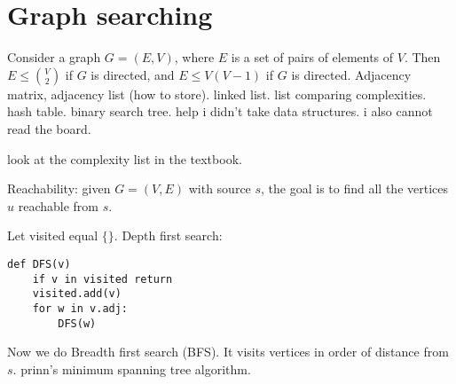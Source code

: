 \section{Graph searching} 
Consider a graph $G=(E,V)$, where $E$ is a set of pairs of elements of $V$. Then $E \leq {V \choose 2} $ if $G$ is directed, and $E \leq  V(V-1)$ if $G$ is directed. Adjacency matrix, adjacency list (how to store). linked list. list comparing complexities. hash table. binary search tree. help i didn't take data structures. i also cannot read the board.

look at the complexity list in the textbook.

Reachability: given $G=(V,E)$ with source $s$, the goal is to find all the vertices $u$ reachable from $s$.

Let visited equal $\{\} $. Depth first search:
\begin{verbatim}
def DFS(v)
    if v in visited return
    visited.add(v)
    for w in v.adj:
        DFS(w) 
\end{verbatim}
Now we do Breadth first search (BFS). It visits vertices in order of distance from $s$. prinn's minimum spanning tree algorithm.
